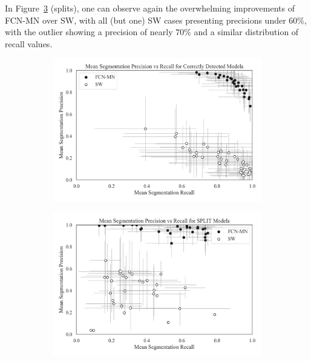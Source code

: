 \documentclass[a4paper,authoryear,review]{elsarticle}
\begin{document}
In Figure~\ref{fig:Figure5-b} (splits), one can observe again the overwhelming improvements of FCN-MN over SW, with all (but one) SW cases presenting precisions under $60\%$, with the outlier showing a precision of nearly  $70\%$ and a similar distribution of recall values.  

\begin{figure}%
    \centering
    \begin{subfigure}[b]{0.97\textwidth}
        \centering
        \includegraphics[width=\textwidth]{figures/Figure5-a.png}
        \caption{}
        \label{fig:Figure5-a}
    \end{subfigure}
    \hfill
    \begin{subfigure}[b]{0.97\textwidth}
        \centering
        \includegraphics[width=\textwidth]{figures/Figure5-b.png}
        \caption{}
        \label{fig:Figure5-b}

\end{subfigure}
\end{figure}
\end{document}
